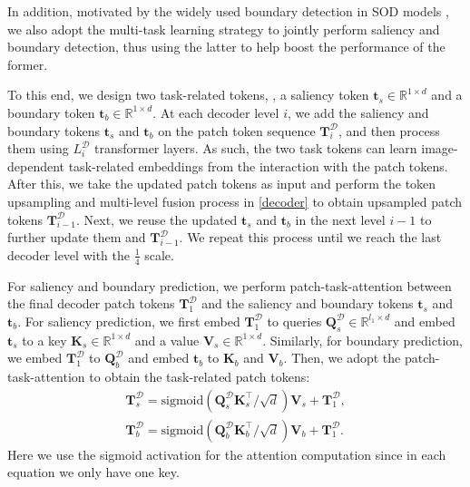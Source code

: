 \documentclass[10pt,twocolumn,letterpaper]{article}
\begin{document}
In addition, motivated by the widely used boundary detection in SOD models \cite{zhao2019EGNet,CVPR2020_LDF,zhang2020select,Wei2020CoNet}, we also adopt the multi-task learning strategy to jointly perform saliency and boundary detection, thus using the latter to help boost the performance of the former.

To this end, we design two task-related tokens, \ie, a saliency token $\bm{t}_s\in{\mathbb{R}^{1 \times d}}$ and a boundary token $\bm{t}_b\in{\mathbb{R}^{1 \times d}}$.
At each decoder level $i$, we add the saliency and boundary tokens $\bm{t}_s$ and $\bm{t}_b$ on the patch token sequence $\bm{T}^{\mathcal{D}}_{i}$, and then process them using $L^{\mathcal{D}}_i$ transformer layers. As such, the two task tokens can learn image-dependent task-related embeddings from the interaction with the patch tokens. After this, we take the updated patch tokens as input and perform the token upsampling and multi-level fusion process in \eqref{decoder} to obtain upsampled patch tokens $\bm{T}^{\mathcal{D}}_{i-1}$. Next, we reuse the updated $\bm{t}_s$ and $\bm{t}_b$ in the next level $i-1$ to further update them and $\bm{T}^{\mathcal{D}}_{i-1}$. We repeat this process until we reach the last decoder level with the $\frac{1}{4}$ scale.

For saliency and boundary prediction, we perform patch-task-attention between the final decoder patch tokens $\bm{T}^{\mathcal{D}}_{1}$ and the saliency and boundary tokens $\bm{t}_s$ and $\bm{t}_b$.
For saliency prediction, we first embed $\bm{T}^{\mathcal{D}}_{1}$ to queries $\bm{Q}^{\mathcal{D}}_s \in {\mathbb{R}^{l_1\times d}}$ and embed $\bm{t}_s$ to a key $\bm{K}_s \in {\mathbb{R}^{1\times d}}$ and a value $\bm{V}_s \in {\mathbb{R}^{1\times d}}$.
Similarly, for boundary prediction, we embed $\bm{T}^{\mathcal{D}}_{1}$ to $\bm{Q}^{\mathcal{D}}_b$ and embed $\bm{t}_b$ to $\bm{K}_b$ and $\bm{V}_b$.
Then, we adopt the patch-task-attention to obtain the task-related patch tokens:
\begin{equation} \label{predict}
\begin{split}
\bm{T}_s^{\mathcal{D}} = \text{sigmoid}(\bm{Q}_s^{\mathcal{D}}\bm{K}_s^{\top} / \sqrt{d})\bm{V}_s + \bm{T}^{\mathcal{D}}_{1}, \\
\bm{T}_b^{\mathcal{D}} = \text{sigmoid}(\bm{Q}_b^{\mathcal{D}}\bm{K}_b^{\top} / \sqrt{d})\bm{V}_b + \bm{T}^{\mathcal{D}}_{1}.
\end{split}
\end{equation}
Here we use the sigmoid activation for the attention computation since in each equation we only have one key.
\end{document}
